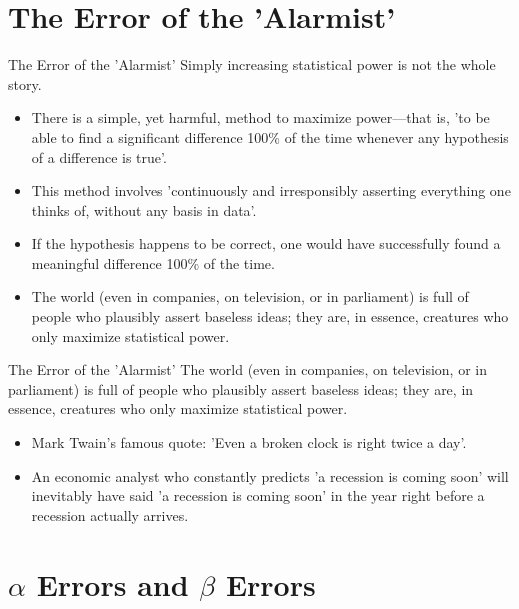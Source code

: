 \documentclass[dvipdfmx, autodetect-engine, aspectratio=169, 10.5pt]{beamer}
\begin{document}
\section{The Error of the 'Alarmist'}

\begin{frame}{The Error of the 'Alarmist'}
	Simply increasing statistical power is not the whole story.
	\begin{itemize}
		\item There is a simple, yet harmful, method to maximize power—that is, 'to be able to find a significant difference 100$\%$ of the time whenever any hypothesis of a difference is true'.
		\item This method involves 'continuously and irresponsibly asserting everything one thinks of, without any basis in data'.
		\item If the hypothesis happens to be correct, one would have successfully found a meaningful difference 100$\%$ of the time.
		\item The world (even in companies, on television, or in parliament) is full of people who plausibly assert baseless ideas; they are, in essence, creatures who only maximize statistical power.
	\end{itemize}
\end{frame}

\begin{frame}{The Error of the 'Alarmist'}
	The world (even in companies, on television, or in parliament) is full of people who plausibly assert baseless ideas; they are, in essence, creatures who only maximize statistical power.
	\begin{itemize}
		\item Mark Twain's famous quote: 'Even a broken clock is right twice a day'.
		      \vspace{5mm}
		\item An economic analyst who constantly predicts 'a recession is coming soon' will inevitably have said 'a recession is coming soon' in the year right before a recession actually arrives.
	\end{itemize}
\end{frame}

\section{$\alpha$ Errors and $\beta$ Errors}
\end{document}
